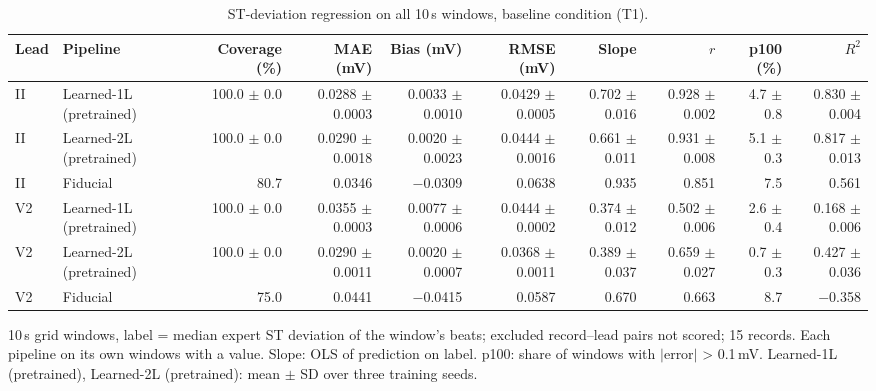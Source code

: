 \begin{table}[htbp]
\centering
\small
\caption{ST-deviation regression on all 10\,s windows, baseline condition (T1).}
\label{tab:t1_regression}
\begin{tabular}{llrrrrrrrr}
\toprule
Lead & Pipeline & Coverage (\%) & MAE (mV) & Bias (mV) & RMSE (mV) & Slope & $r$ & p100 (\%) & $R^2$ \\
\midrule
II & Learned-1L (pretrained) & 100.0 $\pm$ 0.0 & 0.0288 $\pm$ 0.0003 & 0.0033 $\pm$ 0.0010 & 0.0429 $\pm$ 0.0005 & 0.702 $\pm$ 0.016 & 0.928 $\pm$ 0.002 & 4.7 $\pm$ 0.8 & 0.830 $\pm$ 0.004 \\
II & Learned-2L (pretrained) & 100.0 $\pm$ 0.0 & 0.0290 $\pm$ 0.0018 & 0.0020 $\pm$ 0.0023 & 0.0444 $\pm$ 0.0016 & 0.661 $\pm$ 0.011 & 0.931 $\pm$ 0.008 & 5.1 $\pm$ 0.3 & 0.817 $\pm$ 0.013 \\
II & Fiducial & 80.7 & 0.0346 & $-$0.0309 & 0.0638 & 0.935 & 0.851 & 7.5 & 0.561 \\
\midrule
V2 & Learned-1L (pretrained) & 100.0 $\pm$ 0.0 & 0.0355 $\pm$ 0.0003 & 0.0077 $\pm$ 0.0006 & 0.0444 $\pm$ 0.0002 & 0.374 $\pm$ 0.012 & 0.502 $\pm$ 0.006 & 2.6 $\pm$ 0.4 & 0.168 $\pm$ 0.006 \\
V2 & Learned-2L (pretrained) & 100.0 $\pm$ 0.0 & 0.0290 $\pm$ 0.0011 & 0.0020 $\pm$ 0.0007 & 0.0368 $\pm$ 0.0011 & 0.389 $\pm$ 0.037 & 0.659 $\pm$ 0.027 & 0.7 $\pm$ 0.3 & 0.427 $\pm$ 0.036 \\
V2 & Fiducial & 75.0 & 0.0441 & $-$0.0415 & 0.0587 & 0.670 & 0.663 & 8.7 & $-$0.358 \\
\bottomrule
\end{tabular}

\par\smallskip\footnotesize 10\,s grid windows, label = median expert ST deviation of the window's beats; excluded record--lead pairs not scored; 15 records. Each pipeline on its own windows with a value. Slope: OLS of prediction on label. p100: share of windows with $|$error$|$ > 0.1\,mV. Learned-1L (pretrained), Learned-2L (pretrained): mean $\pm$ SD over three training seeds.
\end{table}
